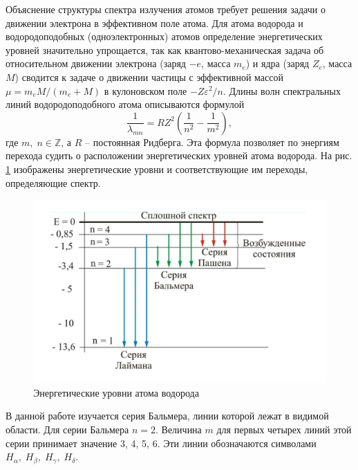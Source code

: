 \documentclass[a4paper]{article}
\renewcommand{\epsilon}{\varepsilon}
\begin{document}
	Объяснение структуры спектра излучения атомов требует решения задачи о движении электрона в эффективном поле атома.	Для атома водорода и водородоподобных (одноэлектронных) атомов 	определение энергетических уровней значительно упрощается, так как	квантово-механическая задача об относительном движении электрона (заряд $ -e $, масса $ m_e $) и ядра (заряд $ Z_e $, масса $ M $) сводится к задаче о движении частицы с эффективной массой $ \mu = m_e M /(m_e+M) $ в кулоновском поле $ - Z \epsilon^2 / n $. Длины волн спектральных линий водородоподобного атома описываются формулой
	\begin{equation}\label{key}
		\dfrac{1}{\lambda_{m n}} = R Z^2 (\dfrac{1}{n^2}-\dfrac{1}{m^2}),
	\end{equation}
	где $ m, \;n \in \mathbb{Z} $, а $ R $ -- постоянная Ридберга.
	Эта формула позволяет по энергиям перехода судить о расположении энергетических уровней атома водорода. На рис. \ref{fig:screenshot1} изображены энергетические уровни и соответствующие им переходы, определяющие спектр.
	\begin{figure}
		\includegraphics[width=1.0\linewidth]{Screenshot_1}
		\caption{Энергетические уровни атома водорода}
		\label{fig:screenshot1}
	\end{figure}
	В данной работе изучается серия Бальмера, линии которой лежат в видимой области. Для серии Бальмера $ n = 2 $. Величина $ m $ для первых четырех линий этой серии принимает значение 3, 4, 5, 6. Эти линии	обозначаются символами $ H_\alpha,\;H_\beta,\;H_\gamma,\;H_\delta $.
	
\end{document}
